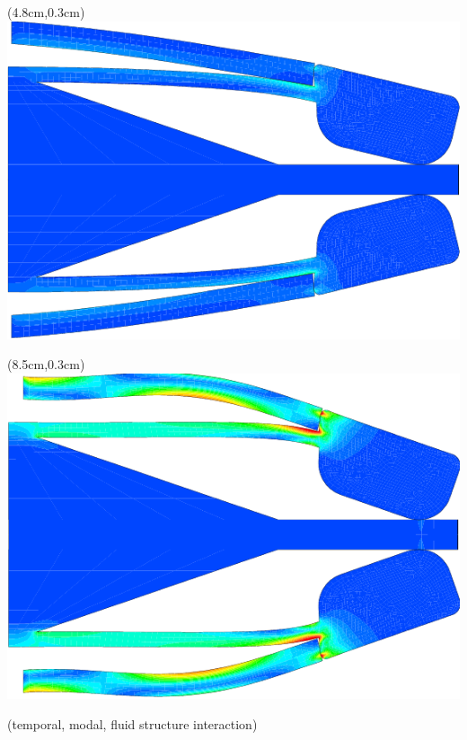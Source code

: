 \begin{frame}{}
{\begin{itemize}
{{\begin{textblock*}{5cm}
      \end{textblock*}
      \begin{textblock*}{5cm}(4.8cm,0.3cm)
        \includegraphics[height=0.25\textheight]{images/sac_a_dos.32}
      \end{textblock*}
    \begin{textblock*}{5cm}(8.5cm,0.3cm)
        \includegraphics[height=0.25\textheight]{images/sac_a_dos.41}
      \end{textblock*}}
                    { (temporal, modal, fluid structure interaction)}\\
    }
\end{itemize}}
\end{frame}
